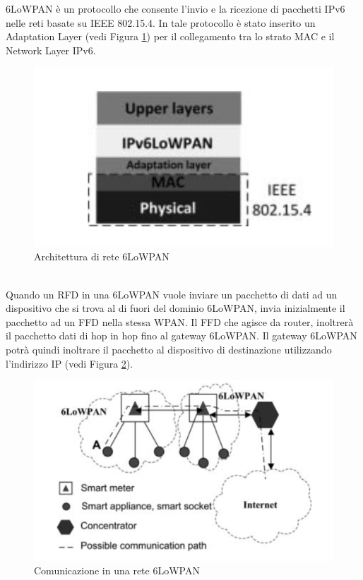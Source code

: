 \newline\newline
6LoWPAN è un protocollo che consente l'invio e la ricezione di pacchetti IPv6 nelle reti basate su IEEE 802.15.4. In tale protocollo è stato inserito un Adaptation Layer (vedi Figura \ref{fig:6pan}) per il collegamento tra lo strato MAC e il Network Layer IPv6.
\begin{figure}[h]
	\centering
	\includegraphics[scale=0.400]{imgs/6pan.png}
	\caption{Architettura di rete 6LoWPAN} \label{fig:6pan}
\end{figure}
\\
Quando un RFD in una 6LoWPAN vuole inviare un pacchetto di dati ad un dispositivo che si trova al di fuori del dominio 6LoWPAN, invia inizialmente il pacchetto ad un FFD nella stessa WPAN. Il FFD che agisce da router, inoltrerà il pacchetto dati di hop in hop fino al gateway 6LoWPAN. Il gateway 6LoWPAN potrà quindi inoltrare il pacchetto al dispositivo di destinazione utilizzando l'indirizzo IP (vedi Figura \ref{fig:6pancom}).
\begin{figure}[h]
	\centering
	\includegraphics[scale=0.450]{imgs/6pancom.png}
	\caption{Comunicazione in una rete 6LoWPAN} \label{fig:6pancom}
\end{figure}
